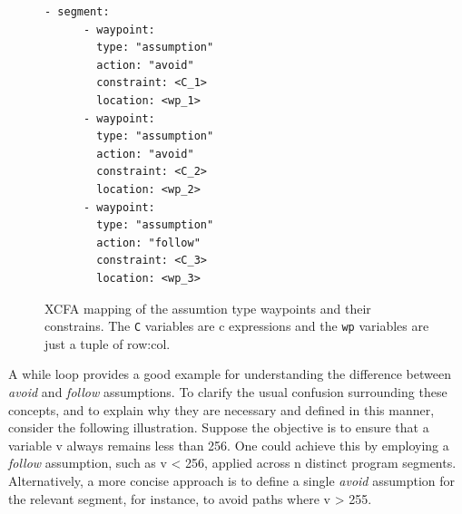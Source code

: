 \begin{figure}[htbp]
  \centering
  \begin{minipage}[t]{0.35\textwidth}
    \begin{lstlisting}[style=c, columns=flexibl]
    - segment:
      - waypoint:
        type: "assumption"
        action: "avoid"
        constraint: <C_1>
        location: <wp_1>
      - waypoint:
        type: "assumption"
        action: "avoid"
        constraint: <C_2>
        location: <wp_2>
      - waypoint:
        type: "assumption"
        action: "follow"
        constraint: <C_3>
        location: <wp_3>
    \end{lstlisting}
    \end{minipage}
  \caption{XCFA mapping of the assumtion type waypoints and their constrains. The \texttt{C}
  variables are c expressions and the \texttt{wp} variables are just a tuple of row:col.}
  \label{fig:combined}
\end{figure}

A while loop provides a good example for understanding the difference between 
\emph{avoid} and \emph{follow} assumptions.
To clarify the usual confusion surrounding these concepts, and to explain why they 
are necessary and defined in this manner, consider the following illustration.
Suppose the objective is to ensure that a variable v always remains less than 256.
One could achieve this by employing a \emph{follow} assumption, such as v < 256, 
applied across n distinct program segments.
Alternatively, a more concise approach is to define a single \emph{avoid} 
assumption for the relevant segment, for instance, to avoid paths where v > 255.

